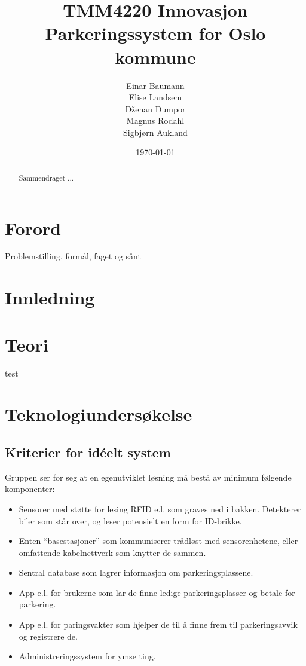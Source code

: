 \documentclass[a4paper, norsk, 12pt]{article}
\title{TMM4220 Innovasjon \\ 
\vspace{6pt}\large Parkeringssystem for Oslo kommune \\ \vspace{50pt} 
 }
\author{Einar Baumann \\Elise Landsem\\D\v{z}enan Dumpor\\Magnus Rodahl\\Sigbjørn Aukland}
\date{\today}
\theoremstyle{remark}
\begin{document}
\maketitle
\thispagestyle{empty}
\vspace{50pt}
\begin{abstract}
Sammendraget ...
\end{abstract}
\pagebreak

\tableofcontents
\pagebreak

\section*{Forord}
Problemstilling, formål, faget og sånt
\pagebreak



\section{Innledning}
\label{sec:innledning}
\cite{vekstbedriften}




\section{Teori}
\label{sec:teori}
test





\section{Teknologiundersøkelse}
\label{sec:teknologi}

\subsection{Kriterier for idéelt system}
\label{sub:ideelt_system}
Gruppen ser for seg at en egenutviklet løsning må bestå av minimum følgende komponenter:

\begin{itemize}
	\item Sensorer med støtte for lesing RFID e.l. som graves ned i bakken. Detekterer biler som står over, og leser potensielt en form for ID-brikke.
	\item Enten “basestasjoner” som kommuniserer trådløst med sensorenhetene, eller omfattende kabelnettverk som knytter de sammen.
	\item Sentral database som lagrer informasjon om parkeringsplassene.
 	\item App e.l. for brukerne som lar de finne ledige parkeringsplasser og betale for parkering.
	\item App e.l. for paringsvakter som hjelper de til å finne frem til parkeringsavvik og registrere de.
	\item Administreringssystem for ymse ting.
\end{itemize}
\end{document}
